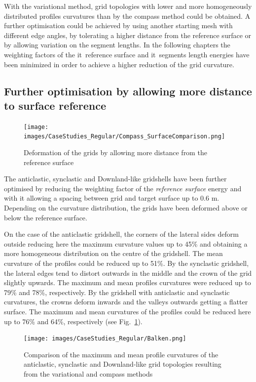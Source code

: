 \documentclass[Thesis.tex]{subfiles}
\begin{document}
With the variational method, grid topologies with lower and more homogeneously distributed profiles curvatures than by the compass method could be obtained. A further optimisation could be achieved by using another starting mesh with different edge angles, by tolerating a higher distance from the reference surface or by allowing variation on the segment lengths. In the following chapters the weighting factors of the {it\ reference surface} and {it\ segments length} energies have been minimized in order to achieve a higher reduction of the grid curvature.

\subsection{Further optimisation by allowing more distance to surface reference}

\begin{figure}
\centering
\texttt{[image: images/CaseStudies\_Regular/Compass\_SurfaceComparison.png]}
\caption{Deformation of the grids by allowing more distance from the reference surface}
\label{fig:Compass_SurfaceComparison}
\end{figure}

The anticlastic, synclastic and Downland-like gridshells have been further optimised by reducing the weighting factor of the {\it reference surface} energy and with it allowing a spacing between grid and target surface up to 0.6 m. Depending on the curvature distribution, the grids have been deformed above or below the reference surface.

On the case of the anticlastic gridshell, the corners of the lateral sides deform outside reducing here the maximum curvature values up to 45\% and obtaining a more homogeneous distribution on the centre of the gridshell. The mean curvature of the profiles could be reduced up to 51\%. By the synclastic gridshell, the lateral edges tend to distort outwards in the middle and the crown of the grid slightly upwards. The maximum and mean profiles curvatures were reduced up to 79\% and 78\%, respectively. By the gridshell with anticlastic and synclastic curvatures, the crowns deform inwards and the valleys outwards getting a flatter surface. The maximum and mean curvatures of the profiles could be reduced here up to 76\% and 64\%, respectively (see Fig.~\ref{fig:Compass_SurfaceComparison}).

\begin{figure}
\centering
\texttt{[image: images/CaseStudies\_Regular/Balken.png]}
\caption{Comparison of the maximum and mean profile curvatures of the anticlastic, synclastic and Downland-like grid topologies resulting from the variational and compass methods}
\label{fig:Balken}
\end{figure}
\end{document}
